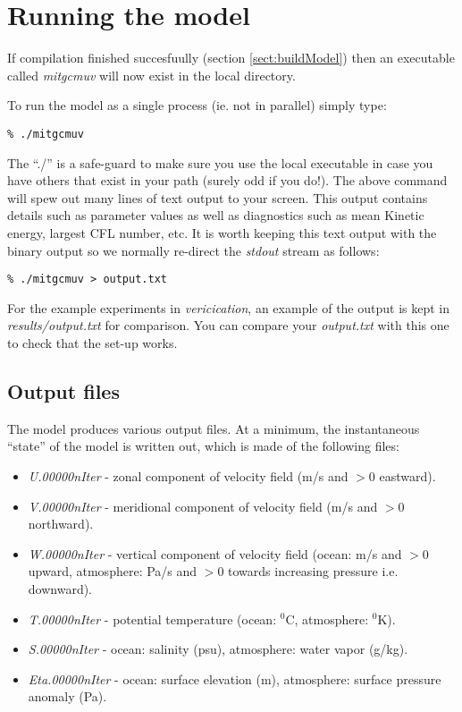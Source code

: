 \section{Running the model}
\label{sect:runModel}

If compilation finished succesfuully (section \ref{sect:buildModel})
then an executable called {\em mitgcmuv} will now exist in the local
directory.

To run the model as a single process (ie. not in parallel) simply
type:
\begin{verbatim}
% ./mitgcmuv
\end{verbatim}
The ``./'' is a safe-guard to make sure you use the local executable
in case you have others that exist in your path (surely odd if you
do!). The above command will spew out many lines of text output to
your screen.  This output contains details such as parameter values as
well as diagnostics such as mean Kinetic energy, largest CFL number,
etc. It is worth keeping this text output with the binary output so we
normally re-direct the {\em stdout} stream as follows:
\begin{verbatim}
% ./mitgcmuv > output.txt
\end{verbatim}

For the example experiments in {\em vericication}, an example of the
output is kept in {\em results/output.txt} for comparison. You can compare
your {\em output.txt} with this one to check that the set-up works.



\subsection{Output files}

The model produces various output files. At a minimum, the instantaneous
``state'' of the model is written out, which is made of the following files:

\begin{itemize}
\item \textit{U.00000nIter} - zonal component of velocity field (m/s and $>
0 $ eastward).

\item \textit{V.00000nIter} - meridional component of velocity field (m/s
and $> 0$ northward).

\item \textit{W.00000nIter} - vertical component of velocity field (ocean:
m/s and $> 0$ upward, atmosphere: Pa/s and $> 0$ towards increasing pressure
i.e. downward).

\item \textit{T.00000nIter} - potential temperature (ocean: $^{0}$C,
atmosphere: $^{0}$K).

\item \textit{S.00000nIter} - ocean: salinity (psu), atmosphere: water vapor
(g/kg).

\item \textit{Eta.00000nIter} - ocean: surface elevation (m), atmosphere:
surface pressure anomaly (Pa).
\end{itemize}

